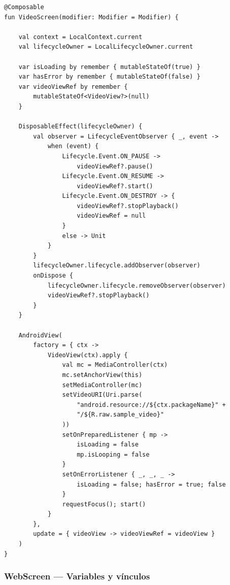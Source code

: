 \documentclass[stu, 12pt, letterpaper, donotrepeattitle, floatsintext, natbib]{apa7}
\begin{document}
\begin{lstlisting}[caption={Variables y vínculos en VideoScreen.kt}]
@Composable
fun VideoScreen(modifier: Modifier = Modifier) {

    val context = LocalContext.current
    val lifecycleOwner = LocalLifecycleOwner.current

    var isLoading by remember { mutableStateOf(true) }
    var hasError by remember { mutableStateOf(false) }
    var videoViewRef by remember {
        mutableStateOf<VideoView?>(null)
    }

    DisposableEffect(lifecycleOwner) {
        val observer = LifecycleEventObserver { _, event ->
            when (event) {
                Lifecycle.Event.ON_PAUSE ->
                    videoViewRef?.pause()
                Lifecycle.Event.ON_RESUME ->
                    videoViewRef?.start()
                Lifecycle.Event.ON_DESTROY -> {
                    videoViewRef?.stopPlayback()
                    videoViewRef = null
                }
                else -> Unit
            }
        }
        lifecycleOwner.lifecycle.addObserver(observer)
        onDispose {
            lifecycleOwner.lifecycle.removeObserver(observer)
            videoViewRef?.stopPlayback()
        }
    }

    AndroidView(
        factory = { ctx ->
            VideoView(ctx).apply {
                val mc = MediaController(ctx)
                mc.setAnchorView(this)
                setMediaController(mc)
                setVideoURI(Uri.parse(
                    "android.resource://${ctx.packageName}" +
                    "/${R.raw.sample_video}"
                ))
                setOnPreparedListener { mp ->
                    isLoading = false
                    mp.isLooping = false
                }
                setOnErrorListener { _, _, _ ->
                    isLoading = false; hasError = true; false
                }
                requestFocus(); start()
            }
        },
        update = { videoView -> videoViewRef = videoView }
    )
}
\end{lstlisting}

\subsubsection{WebScreen --- Variables y vínculos}
\end{document}
